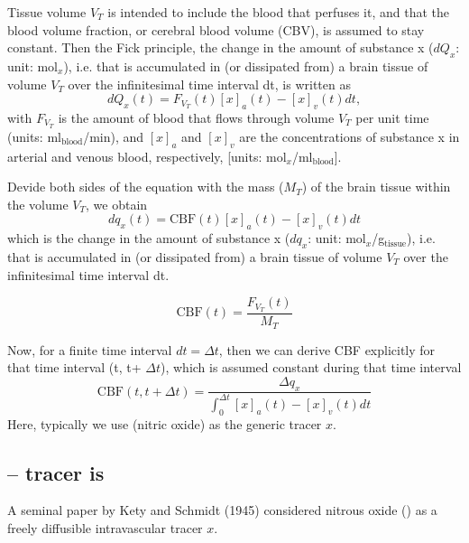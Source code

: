Tissue volume $V_T$ is intended to include the blood that perfuses it, and that
the blood volume fraction, or cerebral blood volume (CBV), is assumed to stay
constant. Then the Fick principle,
the change in the amount of substance x ($dQ_x$: unit: mol$_x$), i.e. 
that is accumulated in (or dissipated from) a brain tissue of volume $V_T$
over the infinitesimal time interval dt, is written as
\begin{equation}
dQ_x(t) = F_{V_T}(t) { [x]_a(t) - [x]_v(t) } dt, 
\end{equation}
with
$F_{V_T}$ is the amount of blood that flows through volume $V_T$ per unit time
(units: ml$_\text{blood}$/min),
and $[x]_a$ and $[x]_v$ are the concentrations of substance x in arterial and
venous blood, respectively, [units: mol$_x$/ml$_\text{blood}$].

Devide both sides of the equation with the mass ($M_T$) of the brain tissue
within the volume $V_T$, we obtain
\begin{equation}
dq_x(t) = \text{CBF}(t) { [x]_a(t) - [x]_v(t) } dt 
\end{equation}
which is the change in the amount of substance x ($dq_x$: unit:
mol$_x$/g$_\text{tissue}$), i.e. that is accumulated in (or dissipated from) a
brain tissue of volume $V_T$ over the infinitesimal time interval dt.

\begin{equation}
\text{CBF}(t) = \frac{F_{V_T}(t)}{M_T}
\end{equation}

Now, for a finite time interval $dt = \Delta t$, then we can derive CBF
explicitly for that time interval (t, t+ $\Delta t$), which is assumed constant
during that time interval
\begin{equation}
\text{CBF}(t, t+\Delta t) = \frac{\Delta q_x}{ \int_0^{\Delta t} { [x]_a(t) -
[x]_v(t)} dt }
\end{equation}
Here, typically we use  (nitric oxide) as the generic tracer $x$.

\subsection{-- tracer is }


A seminal paper by Kety and Schmidt (1945)  considered nitrous oxide ()
as a freely diffusible intravascular tracer $x$.

